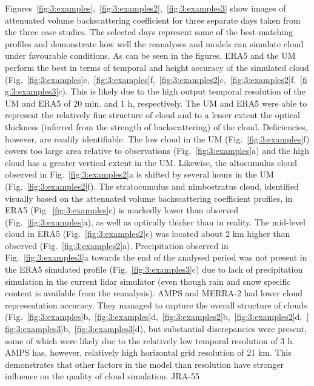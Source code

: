 Figures~\ref{fig:3:examples},~\ref{fig:3:examples2},~\ref{fig:3:examples3} show images of attenuated volume backscattering coefficient for three separate days taken from
the three case studies. The selected days represent some of the best-matching
profiles and demonstrate how well the reanalyses and models can simulate cloud under
favourable conditions. As can be seen in the figures,
ERA5 and the UM perform the best
in terms of temporal and height accuracy of the simulated cloud
(Fig.~\ref{fig:3:examples}c,~\ref{fig:3:examples}f,~\ref{fig:3:examples2}c,~\ref{fig:3:examples2}f,~\ref{fig:3:examples3}c).
This is likely due to the high output temporal resolution of the UM and ERA5 of 20 min. and 1 h,
respectively.
The UM and ERA5 were able to represent the relatively fine structure of cloud and to a lesser extent
the optical thickness (inferred from the strength of backscattering) of the cloud.
Deficiencies, however, are readily
identifiable.
The low cloud in the UM (Fig.~\ref{fig:3:examples}f) covers too large area
relative to observations (Fig.~\ref{fig:3:examples}a) and the high cloud
has a greater vertical extent in the UM. Likewise, the altocumulus cloud
observed in Fig.~\ref{fig:3:examples2}a is shifted by several hours in the UM
(Fig.~\ref{fig:3:examples2}f). The stratocumulus and nimbostratus cloud, identified visually based on the attenuated volume backscattering coefficient profiles, in ERA5 (Fig.~\ref{fig:3:examples}c)
is markedly lower than observed (Fig.~\ref{fig:3:examples}a),
as well as optically thicker than in reality.
The mid-level cloud in ERA5 (Fig.~\ref{fig:3:examples2}c) was located about 2 km higher than observed (Fig.~\ref{fig:3:examples2}a).
Precipitation observed in Fig.~\ref{fig:3:examples3}a towards the end of the analysed period was not present in the ERA5
simulated profile (Fig.~\ref{fig:3:examples3}c) due to lack of precipitation simulation
in the current lidar simulator (even though rain and snow specific content is available from the reanalysis).
AMPS and MERRA-2 had lower cloud representation accuracy. They managed
to capture the overall structure of clouds (Fig.~\ref{fig:3:examples}b,~\ref{fig:3:examples}d,~\ref{fig:3:examples2}b,~\ref{fig:3:examples2}d,~\ref{fig:3:examples3}b,~\ref{fig:3:examples3}d),
but substantial discrepancies were present, some of which were likely due to the
relatively low temporal resolution of 3 h.
AMPS has, however, relatively high horizontal grid resolution of 21 km.
This demonstrates that other factors in the model than resolution have
stronger influence on the quality of cloud simulation.
JRA-55
